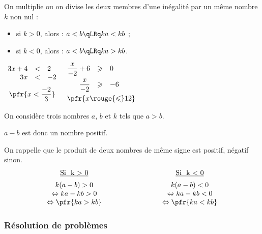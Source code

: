 \documentclass[10pt,openright,twoside,french]{book}
\begin{document}
\begin{Prop}
    On multiplie ou on divise les deux membres d'une inégalité par un même nombre $k$ non nul :
    \begin{itemize}
        \item si $k > 0$, alors : \quad $a < b \qLRq ka < kb$ ;
        \item si $k < 0$, alors : \quad $a < b \qLRq ka > kb$.
    \end{itemize}
\end{Prop}

\begin{Exemple}[s]
    $\begin{array}[t]{rcl}
        3x + 4 & < & 2 \\
        3x & < & -2 \\[7.5pt]
        \multicolumn{3}{c}{\pfr{x < \dfrac{-2}{3}}}
    \end{array}$\quad
    $\begin{array}[t]{rcl}
        \dfrac{x}{-2} + 6 & \geqslant & 0 \\[7.5pt]
        \dfrac{x}{-2} & \geqslant & -6 \\[7.5pt]
        \multicolumn{3}{c}{\pfr{x \rouge{\leqslant} 12}}
    \end{array}$
\end{Exemple}

\begin{Demo}
    On considère trois nombres $a$, $b$ et $k$ tels que $a > b$.\par
    $a - b$ est donc un nombre positif.\par
    On rappelle que le produit de deux nombres de même signe est positif, négatif sinon.
    \[\begin{array}{c@{\hspace*{3cm}}c}
        \underbar{\text{Si } k > 0} & \underbar{\text{Si } k < 0} \\[5pt]
        k(a - b) > 0 & k(a - b) < 0 \\
        \Leftrightarrow ka - kb > 0 & \Leftrightarrow ka - kb < 0 \\
        \Leftrightarrow \pfr{ka > kb} & \Leftrightarrow \pfr{ka < kb}
    \end{array}\]
\end{Demo}\medskip

\subsubsection{Résolution de problèmes}
\end{document}
